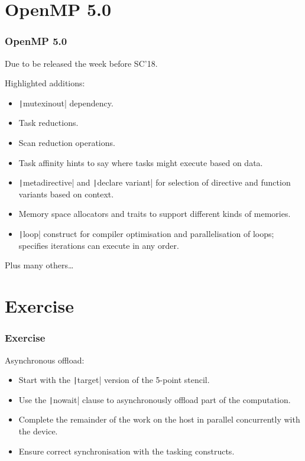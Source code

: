 \documentclass{beamer}
\begin{document}
\section{OpenMP 5.0}
\begin{frame}
\frametitle{OpenMP 5.0}

Due to be released the week before SC'18.

Highlighted additions:
\begin{itemize}
  \item \texttt|mutexinout| dependency.
  \item Task reductions.
  \item Scan reduction operations.
  \item Task affinity hints to say where tasks might execute based on data.
  \item \texttt|metadirective| and \texttt|declare variant| for selection of directive and function variants based on context.
  \item Memory space allocators and traits to support different kinds of memories.
  \item \texttt|loop| construct for compiler optimisation and parallelisation of loops; specifies iterations can execute in any order.
\end{itemize}

Plus many others\dots

\end{frame}

\section{Exercise}
\begin{frame}
\frametitle{Exercise}

Asynchronous offload:
\begin{itemize}
  \item Start with the \texttt|target| version of the 5-point stencil.
  \item Use the \texttt|nowait| clause to asynchronously offload part of the computation.
  \item Complete the remainder of the work on the host in parallel concurrently with the device.
  \item Ensure correct synchronisation with the tasking constructs.
\end{itemize}

\end{frame}
\end{document}
